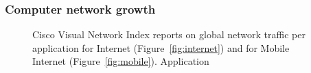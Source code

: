 \subsubsection*{Computer network growth} \label{sec:intro:net_evolution}

\begin{figure}[ht] 
  \centering 
  \caption{Cisco Visual Network Index reports on global network traffic per
    application for Internet (Figure~\ref{fig:internet}) and for Mobile
    Internet (Figure~\ref{fig:mobile}). Application } 
  \label{fig:internet_applications} 
\end{figure}

